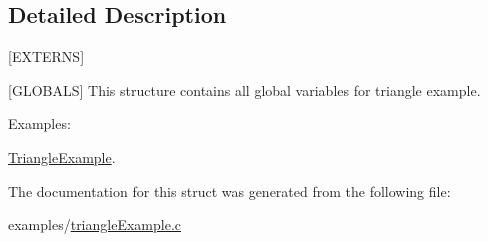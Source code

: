 \subsection{Detailed Description}
\mbox{[}E\+X\+T\+E\+R\+NS\mbox{]} 

\mbox{[}G\+L\+O\+B\+A\+LS\mbox{]} This structure contains all global variables for triangle example. \begin{Desc}
\item[Examples\+: ]\par
\hyperlink{TriangleExample-example}{Triangle\+Example}.\end{Desc}


The documentation for this struct was generated from the following file\+:\begin{DoxyCompactItemize}
\item 
examples/\hyperlink{triangleExample_8c}{triangle\+Example.\+c}\end{DoxyCompactItemize}
